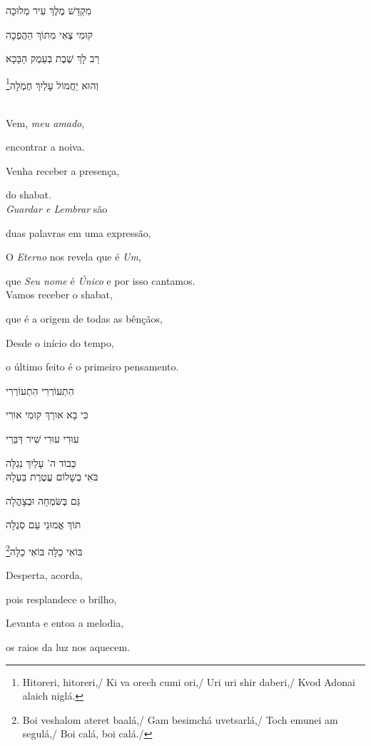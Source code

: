 מִקְדַּשׁ מֶלֶךְ עִיר מְלוּכָה

קוּמִי צְאִי מִתּוֹךְ הַהֲפֵכָה

רַב לָךְ שֶׁבֶת בְּעֵמֶק הַבָּכָא

וְהוּא יַחֲמוֹל עָלַיִךְ חֶמְלָּה\footnote{Hitoreri, hitoreri,/ Ki va orech cumi ori,/ Uri uri shir daberi,/
Kvod Adonai alaich niglá.}


\movetooddpage
\raggedright

\textsc{}\\[15pt]

Vem, \emph{meu amado},

encontrar a noiva.

Venha receber a presença,

do shabat.\\[10pt]

\emph{Guardar e Lembrar} são

duas palavras em uma expressão,

O \emph{Eterno} nos revela que é \emph{Um},

que \emph{Seu nome} é \emph{Único} e por isso cantamos.\\[10pt]

Vamos receber o shabat,

que é a origem de todas as bênçãos,

Desde o início do tempo,

o último feito é o primeiro pensamento.

\movetoevenpage
\raggedleft

הִתְעוֹרְרִי הִתְעוֹרְרִי

כִּי בָא אורֵךְ קוּמִי אוֹרִי

עוּרִי עוּרִי שִׁיר דַּבֵּרִי

כְּבוֹד ה' עָלַיִךְ נִגְלָּה\\[10pt]

בֹּאִי בְשָׁלוֹם עֲטֶרֶת בַּעְלָהּ

גַּם בְּשִּׂמְחָה וּבְצָהֳלָה

תּוֹךְ אֱמוּנֵי עַם סְגֻלָּה

בּוֹאִי כַלָּה בּוֹאִי כַלָּה\footnote{
Boi veshalom ateret baalá,/ Gam besimchá uvetsarlá,/
Toch emunei am segulá,/ Boi calá, boi calá./}

\movetooddpage
\raggedright

Desperta, acorda,

pois resplandece o brilho,

Levanta e entoa a melodia,

os raios da luz nos aquecem.\\[10pt]

